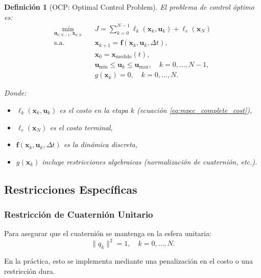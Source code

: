 \documentclass[11pt,a4paper]{article}
\newtheorem{definition}[theorem]{Definición}
\begin{document}
\begin{definition}[OCP: Optimal Control Problem]
El problema de control óptimo es:
\begin{equation}
\boxed{
\begin{aligned}
\min_{\mathbf{u}_{0:N-1}, \mathbf{x}_{0:N}} & \quad J = \sum_{k=0}^{N-1} \ell_k(\mathbf{x}_k, \mathbf{u}_k) + \ell_e(\mathbf{x}_N) \\
\text{s.a.} & \quad \mathbf{x}_{k+1} = \mathbf{f}(\mathbf{x}_k, \mathbf{u}_k, \Delta t), \\
& \quad \mathbf{x}_0 = \mathbf{x}_{\text{medido}}(t), \\
& \quad \mathbf{u}_{\min} \leq \mathbf{u}_k \leq \mathbf{u}_{\max}, \quad k = 0, \ldots, N-1, \\
& \quad g(\mathbf{x}_k) = 0, \quad k = 0, \ldots, N.
\end{aligned}
}
\label{eq:ocp_formulation}
\end{equation}

Donde:
\begin{itemize}
    \item $\ell_k(\mathbf{x}_k, \mathbf{u}_k)$ es el costo en la etapa $k$ (ecuación \eqref{eq:mpcc_complete_cost}),
    \item $\ell_e(\mathbf{x}_N)$ es el costo terminal,
    \item $\mathbf{f}(\mathbf{x}_k, \mathbf{u}_k, \Delta t)$ es la dinámica discreta,
    \item $g(\mathbf{x}_k)$ incluye restricciones algebraicas (normalización de cuaternión, etc.).
\end{itemize}
\end{definition}

\subsection{Restricciones Específicas}

\subsubsection{Restricción de Cuaternión Unitario}

Para asegurar que el cuaternión se mantenga en la esfera unitaria:
\begin{equation}
    \|q_k\|^2 = 1, \quad k = 0, \ldots, N.
\end{equation}

En la práctica, esto se implementa mediante una penalización en el costo o una restricción dura.
\end{document}
